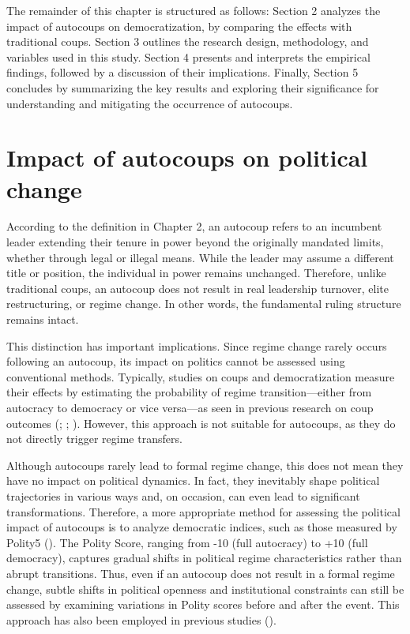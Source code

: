 \documentclass[
  12pt,
]{report}
\begin{document}
The remainder of this chapter is structured as follows: Section 2
analyzes the impact of autocoups on democratization, by comparing the
effects with traditional coups. Section 3 outlines the research design,
methodology, and variables used in this study. Section 4 presents and
interprets the empirical findings, followed by a discussion of their
implications. Finally, Section 5 concludes by summarizing the key
results and exploring their significance for understanding and
mitigating the occurrence of autocoups.

\section{Impact of autocoups on political
change}\label{impact-of-autocoups-on-political-change}

According to the definition in Chapter 2, an autocoup refers to an
incumbent leader extending their tenure in power beyond the originally
mandated limits, whether through legal or illegal means. While the
leader may assume a different title or position, the individual in power
remains unchanged. Therefore, unlike traditional coups, an autocoup does
not result in real leadership turnover, elite restructuring, or regime
change. In other words, the fundamental ruling structure remains intact.

This distinction has important implications. Since regime change rarely
occurs following an autocoup, its impact on politics cannot be assessed
using conventional methods. Typically, studies on coups and
democratization measure their effects by estimating the probability of
regime transition---either from autocracy to democracy or vice
versa---as seen in previous research on coup outcomes
(;
;
). However, this approach is not
suitable for autocoups, as they do not directly trigger regime
transfers.

Although autocoups rarely lead to formal regime change, this does not
mean they have no impact on political dynamics. In fact, they inevitably
shape political trajectories in various ways and, on occasion, can even
lead to significant transformations. Therefore, a more appropriate
method for assessing the political impact of autocoups is to analyze
democratic indices, such as those measured by Polity5
(). The Polity Score,
ranging from -10 (full autocracy) to +10 (full democracy), captures
gradual shifts in political regime characteristics rather than abrupt
transitions. Thus, even if an autocoup does not result in a formal
regime change, subtle shifts in political openness and institutional
constraints can still be assessed by examining variations in Polity
scores before and after the event. This approach has also been employed
in previous studies ().
\end{document}
